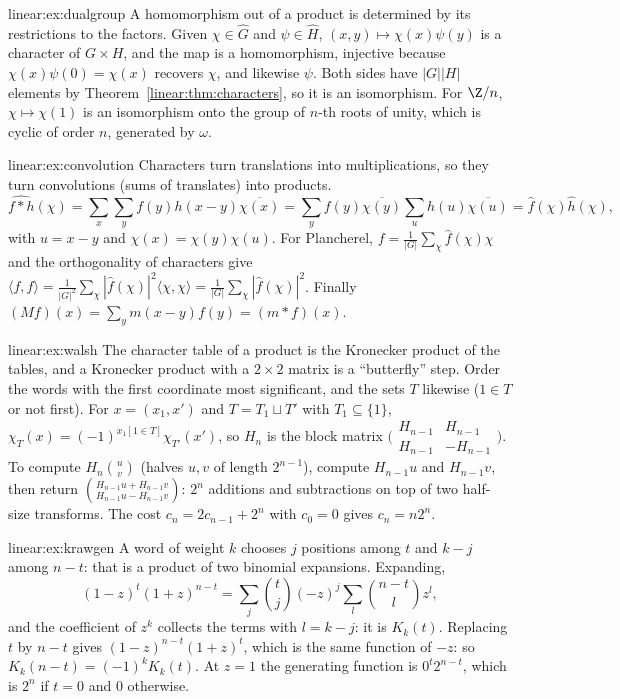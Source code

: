 \begin{solution}{linear:ex:dualgroup}
\idea A homomorphism out of a product is determined by its restrictions to the factors.
\writeup Given $\chi\in\widehat G$ and $\psi\in\widehat H$, $(x,y)\mapsto\chi(x)\psi(y)$ is a character of $G\times H$, and the map is a
homomorphism, injective because $\chi(x)\psi(0)=\chi(x)$ recovers $\chi$, and likewise $\psi$. Both sides have $|G||H|$ elements by
Theorem~\ref{linear:thm:characters}, so it is an isomorphism. For $\Z/n$, $\chi\mapsto\chi(1)$ is an isomorphism onto the group of $n$-th roots of
unity, which is cyclic of order $n$, generated by $\omega$.
\end{solution}

\begin{solution}{linear:ex:convolution}
\idea Characters turn translations into multiplications, so they turn convolutions (sums of translates) into products.
\writeup
\[
\widehat{f*h}(\chi)=\sum_x\sum_yf(y)h(x-y)\overline{\chi(x)}=\sum_yf(y)\overline{\chi(y)}\sum_uh(u)\overline{\chi(u)}=\hat f(\chi)\hat h(\chi),
\]
with $u=x-y$ and $\chi(x)=\chi(y)\chi(u)$. For Plancherel, $f=\frac1{|G|}\sum_\chi\hat f(\chi)\chi$ and the orthogonality of characters
give $\langle f,f\rangle=\frac1{|G|^2}\sum_\chi|\hat f(\chi)|^2\langle\chi,\chi\rangle=\frac1{|G|}\sum_\chi|\hat f(\chi)|^2$. Finally
$(Mf)(x)=\sum_ym(x-y)f(y)=(m*f)(x)$.
\end{solution}

\begin{solution}{linear:ex:walsh}
\idea The character table of a product is the Kronecker product of the tables, and a Kronecker product with a $2\times2$ matrix
is a ``butterfly'' step.
\writeup Order the words with the first coordinate most significant, and the sets $T$ likewise ($1\in T$ or not first). For
$x=(x_1,x')$ and $T=T_1\sqcup T'$ with $T_1\subseteq\{1\}$, $\chi_T(x)=(-1)^{x_1[1\in T]}\chi_{T'}(x')$, so $H_n$ is the block matrix
$\bigl(\begin{smallmatrix}H_{n-1}&H_{n-1}\\H_{n-1}&-H_{n-1}\end{smallmatrix}\bigr)$. To compute $H_n\binom uv$ (halves $u,v$ of length
$2^{n-1}$), compute $H_{n-1}u$ and $H_{n-1}v$, then return $\binom{H_{n-1}u+H_{n-1}v}{H_{n-1}u-H_{n-1}v}$: $2^n$ additions and subtractions
on top of two half-size transforms. The cost $c_n=2c_{n-1}+2^n$ with $c_0=0$ gives $c_n=n2^n$.
\end{solution}

\begin{solution}{linear:ex:krawgen}
\idea A word of weight $k$ chooses $j$ positions among $t$ and $k-j$ among $n-t$: that is a product of two binomial expansions.
\writeup Expanding,
\[
(1-z)^t(1+z)^{n-t}=\sum_j\binom tj(-z)^j\sum_l\binom{n-t}lz^l,
\]
and the coefficient of $z^k$ collects the terms with $l=k-j$: it is $K_k(t)$.
Replacing $t$ by $n-t$ gives $(1-z)^{n-t}(1+z)^t$, which is the same function of $-z$: so $K_k(n-t)=(-1)^kK_k(t)$. At $z=1$ the
generating function is $0^t2^{n-t}$, which is $2^n$ if $t=0$ and $0$ otherwise.
\end{solution}

